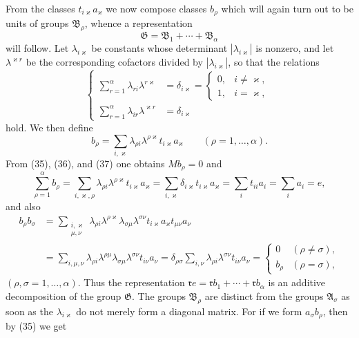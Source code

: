 \documentclass[11pt]{article}
\begin{document}
From the classes $t_{i\varkappa}a_\varkappa$ we now compose classes $b_\rho$ which will again turn out to be units of groups $\mathfrak B_\rho$, whence a representation
\[
 \mathfrak G=\mathfrak B_1+\cdots+\mathfrak B_\alpha
\]
will follow. Let $\lambda_{i\varkappa}$ be constants whose determinant $|\lambda_{i\varkappa}|$ is nonzero, and let $\lambda^{\varkappa r}$ be the corresponding cofactors divided by $|\lambda_{i\varkappa}|$, so that the relations
\begin{equation}
\left\{
\begin{aligned}
 \sum_{r=1}^{\alpha}\lambda_{ri}\lambda^{r\varkappa}&=\delta_{i\varkappa}=\begin{cases}0,&i\ne\varkappa,\\1,&i=\varkappa,
 \end{cases}\\
 \sum_{r=1}^{\alpha}\lambda_{ir}\lambda^{\varkappa r}&=\delta_{i\varkappa}
\end{aligned}\right.
\tag{36}
\end{equation}
hold. We then define
\begin{equation}
 b_\rho=\sum_{i,\varkappa}\lambda_{\rho i}\lambda^{\rho\varkappa}t_{i\varkappa}a_\varkappa
 \qquad(\rho=1,
\ldots,\alpha).
\tag{37}
\end{equation}
From (35), (36), and (37) one obtains $Mb_\rho=0$ and
\begin{equation}
 \sum_{\rho=1}^{\alpha}b_\rho
 =\sum_{i,\varkappa,\rho}\lambda_{\rho i}\lambda^{\rho\varkappa}t_{i\varkappa}a_\varkappa
 =\sum_{i,\varkappa}\delta_{i\varkappa}t_{i\varkappa}a_\varkappa
 =\sum_i t_{ii}a_i=\sum_i a_i=e,
\tag{38}
\end{equation}
and also
\[
\begin{aligned}
 b_\rho b_\sigma
 &=\sum_{\substack{i,\varkappa\\ \mu,\nu}}
  \lambda_{\rho i}\lambda^{\rho\varkappa}\lambda_{\sigma\mu}\lambda^{\sigma\nu}
  t_{i\varkappa}a_\varkappa t_{\mu\nu}a_\nu \\
 &=\sum_{i,\mu,\nu}\lambda_{\rho i}\lambda^{\rho\mu}\lambda_{\sigma\mu}\lambda^{\sigma\nu}t_{i\nu}a_\nu
 =\delta_{\rho\sigma}\sum_{i,\nu}\lambda_{\rho i}\lambda^{\sigma\nu}t_{i\nu}a_\nu
 =\begin{cases}0&(\rho\ne\sigma),\\ b_\rho&(\rho=\sigma),\end{cases}
\end{aligned}
\]
$(\rho,
\sigma=1,
\ldots,
\alpha)$. Thus the representation $\mathfrak r e=\mathfrak r b_1+\cdots+\mathfrak r b_\alpha$ is an additive decomposition of the group $\mathfrak G$. The groups $\mathfrak B_\rho$ are distinct from the groups $\mathfrak A_\sigma$ as soon as the $\lambda_{i\varkappa}$ do not merely form a diagonal matrix. For if we form $a_\sigma b_\rho$, then by (35) we get
\end{document}
